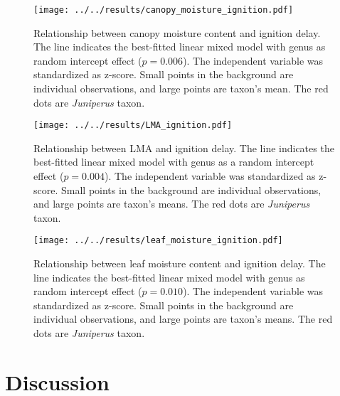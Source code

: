 \documentclass{ttuthes2007}
\begin{document}
\begin{figure}[ht]
    \centering
    \texttt{[image: ../../results/canopy\_moisture\_ignition.pdf]}
    \caption{Relationship between canopy moisture content and ignition delay. The line indicates the best-fitted linear mixed model with genus as random intercept effect ($p = 0.006$). The independent variable was standardized  as z-score. Small points in the background are individual observations, and large points are taxon's mean. The red dots are \emph{Juniperus} taxon.}
    \label{fig:canopy_moisture_ig_delay}
\end{figure}

\begin{figure}[ht]
  \centering \texttt{[image: ../../results/LMA\_ignition.pdf]}
  \caption{Relationship between LMA and ignition delay. The line indicates the best-fitted linear mixed model with genus as a random intercept effect ($p = 0.004$). The independent variable was standardized  as z-score. Small points in the background are individual observations, and large points are taxon's means. The red dots are \emph{Juniperus} taxon.}
  \label{fig:lma_ig_delay}
\end{figure}



\begin{figure}[ht]
  \centering \texttt{[image: ../../results/leaf\_moisture\_ignition.pdf]}
  \caption{Relationship between leaf moisture content and ignition delay. The line indicates the best-fitted linear mixed model with genus as random intercept effect ($p = 0.010$). The independent variable was standardized  as z-score. Small points in the background are individual observations, and large points are taxon's means. The red dots are \emph{Juniperus} taxon.}
  \label{fig:leafmc_ig_delay}
\end{figure}



\clearpage
\section{Discussion}
\end{document}
